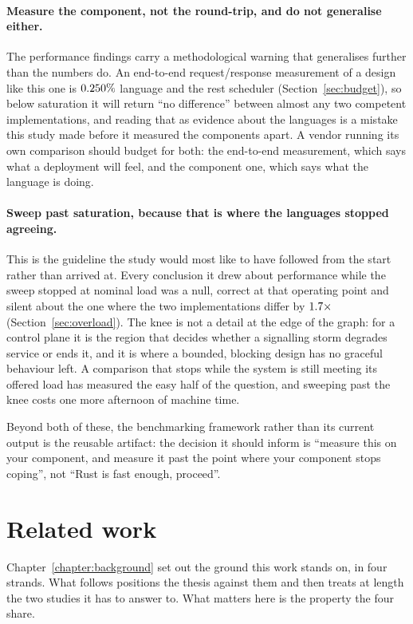 \documentclass[english,twoside,openright,a4paper,censored,csm,software-track-2020]{HYthesisML}
\begin{document}
\paragraph{Measure the component, not the round-trip, and do not generalise either.}
The performance findings carry a methodological warning that generalises further than the
numbers do. An end-to-end request/response measurement of a design like this one is
$0.250\%$ language and the rest scheduler (Section~\ref{sec:budget}), so below
saturation it will return ``no difference'' between almost any two competent implementations,
and reading that as evidence about the languages is a mistake this study made before it measured
the components apart. A vendor running its own comparison should budget for both: the
end-to-end measurement, which says what a deployment will feel, and the component one, which
says what the language is doing.

\paragraph{Sweep past saturation, because that is where the languages stopped agreeing.}
This is the guideline the study would most like to have followed from the start rather than
arrived at. Every conclusion it drew about performance while the sweep stopped at nominal load
was a null, correct at that operating point and silent about the one where the two
implementations differ by $1.7\times$ (Section~\ref{sec:overload}). The knee is
not a detail at the edge of the graph: for a control plane it is the region that decides whether
a signalling storm degrades service or ends it, and it is where a bounded, blocking design has
no graceful behaviour left. A comparison that stops while the system is still meeting its
offered load has measured the easy half of the question, and sweeping past the knee costs one
more afternoon of machine time.

Beyond both of these, the benchmarking framework rather than its current output is the reusable
artifact: the decision it should inform is ``measure this on your component, and measure it past
the point where your component stops coping'', not ``Rust is fast enough, proceed''.

\section{Related work}\label{sec:relatedwork}
Chapter~\ref{chapter:background} set out the ground this work stands on, in four strands. What
follows positions the thesis against them and then treats at length the two studies it has to
answer to. What matters here is the property the four share.
\end{document}
